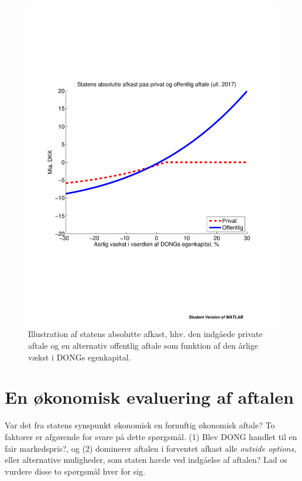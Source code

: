 \documentclass{article}
\begin{document}
\begin{figure}
\includegraphics[scale=0.8]{../matlab/figs/private_public_deal}
\caption{Illustration af statens absolutte afkast, hhv. den indg\aa{}ede private aftale og en alternativ offentlig aftale som funktion af den \aa{}rlige v\ae{}kst i DONGs egenkapital. }
\label{fig:privat_off}
\end{figure}


\section{En økonomisk evaluering af aftalen}

Var det fra statens synspunkt økonomisk en fornuftig økonomisk aftale? To faktorer er afgørende for svare på dette spørgsmål. (1) Blev DONG handlet til en fair markedspris?, og (2) dominerer aftalen i forventet afkast  alle \emph{outside options,} eller alternative muligheder, som staten havde ved indgåelse af aftalen? Lad os vurdere disse to spørgsmål hver for sig.
\end{document}
